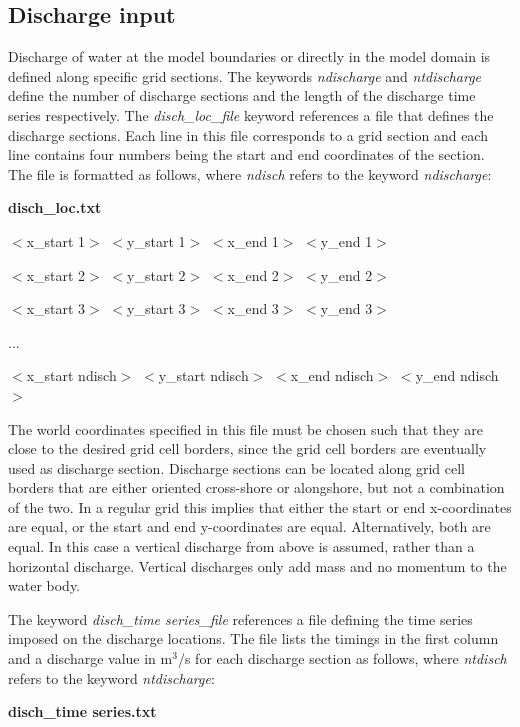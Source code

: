 \documentclass{article}
\begin{document}
\subsection{ Discharge input}

\noindent Discharge of water at the model boundaries or directly in the model domain is defined along specific grid sections. The keywords \textit{ndischarge} and \textit{ntdischarge} define the number of discharge sections and the length of the discharge time series respectively. The \textit{disch\_loc\_file }keyword references a file that defines the discharge sections. Each line in this file corresponds to a grid section and each line contains four numbers being the start and end coordinates of the section. The file is formatted as follows, where \textit{ndisch} refers to the keyword \textit{ndischarge}:

\noindent \textbf{disch\_loc.txt}

\noindent $<$x\_start 1$>$ $<$y\_start 1$>$ $<$x\_end 1$>$ $<$y\_end 1$>$

\noindent $<$x\_start 2$>$ $<$y\_start 2$>$ $<$x\_end 2$>$ $<$y\_end 2$>$

\noindent $<$x\_start 3$>$ $<$y\_start 3$>$ $<$x\_end 3$>$ $<$y\_end 3$>$

\noindent ...

\noindent $<$x\_start ndisch$>$ $<$y\_start ndisch$>$ $<$x\_end ndisch$>$ $<$y\_end ndisch$>$

\noindent The world coordinates specified in this file must be chosen such that they are close to the desired grid cell borders, since the grid cell borders are eventually used as discharge section. Discharge sections can be located along grid cell borders that are either oriented cross-shore or alongshore, but not a combination of the two. In a regular grid this implies that either the start or end x-coordinates are equal, or the start and end y-coordinates are equal. Alternatively, both are equal. In this case a vertical discharge from above is assumed, rather than a horizontal discharge. Vertical discharges only add mass and no momentum to the water body.

\noindent The keyword \textit{disch\_time series\_file} references a file defining the time series imposed on the discharge locations. The file lists the timings in the first column and a discharge value in m${}^{3}$/s for each discharge section as follows, where \textit{ntdisch} refers to the keyword \textit{ntdischarge}:

\noindent \textbf{disch\_time series.txt}
\end{document}
